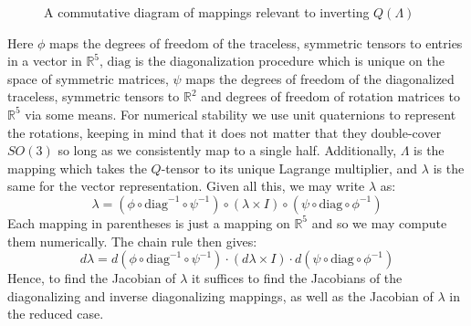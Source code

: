 \documentclass[reqno]{article}
\begin{document}
  \begin{figure}[h]
    \centering
    \caption{A commutative diagram of mappings relevant to inverting
      $Q(\Lambda)$}
    \label{fig:commutative-diagram}
  \end{figure}
  Here $\phi$ maps the degrees of freedom of the traceless, symmetric
  tensors to entries in a vector in $\mathbb{R}^5$, $\text{diag}$ is the
  diagonalization procedure which is unique on the space of symmetric matrices,
  $\psi$ maps the degrees of freedom of the diagonalized traceless, symmetric
  tensors to $\mathbb{R}^2$ and degrees of freedom of rotation matrices to
  $\mathbb{R}^5$ via some means.
  For numerical stability we use unit quaternions to represent the rotations, keeping
  in mind that it does not matter that they double-cover $SO(3)$ so long as we
  consistently map to a single half.
  Additionally, $\Lambda$ is the mapping which takes the $Q$-tensor to its
  unique Lagrange multiplier, and $\lambda$ is the same for the vector
  representation.
  Given all this, we may write $\lambda$ as:
  \begin{equation}
    \lambda
    =
    \left( \phi \circ \text{diag}^{-1} \circ \psi^{-1} \right) \circ
    \left( \lambda \times I \right) \circ
    \left( \psi \circ \text{diag} \circ \phi^{-1} \right)
  \end{equation}
  Each mapping in parentheses is just a mapping on $\mathbb{R}^5$ and so we may
  compute them numerically.
  The chain rule then gives:
  \begin{equation}
    d \lambda
    =
    d\left( \phi \circ \text{diag}^{-1} \circ \psi^{-1} \right)
    \cdot \left( d\lambda \times I \right)
    \cdot d\left( \psi \circ \text{diag} \circ \phi^{-1} \right)
  \end{equation}
  Hence, to find the Jacobian of $\lambda$ it suffices to find the Jacobians of
  the diagonalizing and inverse diagonalizing mappings, as well as the Jacobian
  of $\lambda$ in the reduced case.
  
\end{document}
